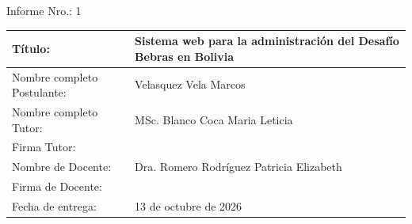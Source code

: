 \documentclass[11pt,letterpaper]{article}
\newcommand{\nroinforme}{1}
\newcommand{\fechaentrega}{13 de octubre de 2026}
\begin{document}
\begin{center}
\large Informe Nro.: \nroinforme
\end{center}

\vspace{0.4cm}

\begin{tabular}{|p{}|p{}|}
\hline
Título: & Sistema web para la administración del Desafío Bebras en Bolivia \\ \hline
Nombre completo Postulante: & Velasquez Vela Marcos \\ \hline
Nombre completo Tutor: & MSc. Blanco Coca Maria Leticia \\ \hline
Firma Tutor: & \rule{0pt}{0.9cm} \\ \hline
Nombre de Docente: & Dra. Romero Rodríguez Patricia Elizabeth \\ \hline
Firma de Docente: & \rule{0pt}{0.9cm} \\ \hline
Fecha de entrega: & \fechaentrega \\ \hline
\end{tabular}

\vspace{0.5cm}
\end{document}
